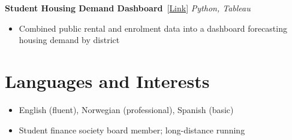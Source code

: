 \documentclass[10pt, a4paper]{article}   %
\newcommand{\projentry}[3]{%
    \noindent\textbf{#1}~{\small[\href{#2}{Link}]}
    \hfill {\small\textit{#3}}%
}
\begin{document}
\vspace{3pt}
\projentry{Student Housing Demand Dashboard}{https://example.com/housing-dashboard}{Python, Tableau}
\begin{itemize}
    \item Combined public rental and enrolment data into a dashboard forecasting housing demand by district
\end{itemize}

\section{Languages and Interests}
\begin{itemize}
    \item English (fluent), Norwegian (professional), Spanish (basic)
    \item Student finance society board member; long-distance running
\end{itemize}
\end{document}
